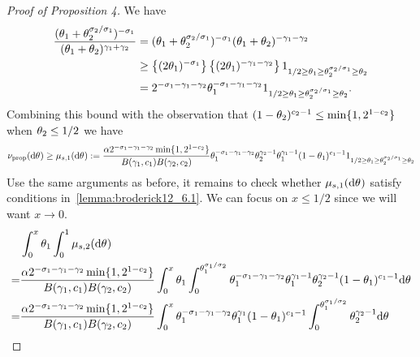 \begin{proof}[Proof of Proposition 4]
We have 
\begin{align*}
    \frac{(\variantfreqperpop{1}+\variantfreqperpop{2}^{\rate{2}/\rate{1}})^{-\rate{1}}}{(\variantfreqperpop{1}+\variantfreqperpop{2})^{\corr{1}+\corr{2}}}&=(\variantfreqperpop{1}+\variantfreqperpop{2}^{\rate{2}/\rate{1}})^{-\rate{1}}(\variantfreqperpop{1}+\variantfreqperpop{2})^{-\corr{1}-\corr{2}}\\
    &\ge \left\{ (2\variantfreqperpop{1} )^{-\rate{1}} \right\} \left\{(2\variantfreqperpop{1})^{-\corr{1} - \corr{2}} \right\}\bm{1}_{1/2 \ge \variantfreqperpop{1} \ge \variantfreqperpop{2}^{\rate{2}/\rate{1}}\ge \variantfreqperpop{2}  } \\
    &= 2^{-\rate{1}-\corr{1}-\corr{2}} \variantfreqperpop{1}^{-\rate{1}-\corr{1}-\corr{2}}\bm{1}_{1/2 \ge \variantfreqperpop{1} \ge \variantfreqperpop{2}^{\rate{2}/\rate{1}}\ge \variantfreqperpop{2}  }.
\end{align*}
Combining this bound with the observation that $(1-\theta_{2})^{c_{2}-1}\le \min\{1, 2^{1-c_{2}}\}$ when $\theta_{2}\le 1/2$ we have
\begin{align*}
    \ratemeasproposed(\de\vecvariantfreq{})\ge\mu_{s,1}(\de\vecvariantfreq{}):= \frac{\mass 2^{-\rate{1}-\corr{1}-\corr{2}}\min\{1, 2^{1-\conc{2}}\}}{B(\corr{1}, \conc{1})B(\corr{2}, \conc{2})}\variantfreqperpop{1}^{-\rate{1}-\corr{1}-\corr{2}} \variantfreqperpop{2}^{\corr{2}-1}\variantfreqperpop{1}^{\corr{1}-1}(1-\variantfreqperpop{1})^{\conc{1}-1} \bm{1}_{1/2 \ge \variantfreqperpop{1} \ge \variantfreqperpop{2}^{\rate{2}/\rate{1}}\ge \variantfreqperpop{2}}
\end{align*}
Use the same arguments as before, it remains to check whether $\mu_{s,1}(\de\vecvariantfreq{})$ satisfy conditions in~\cref{lemma:broderick12_6.1}. We can focus on $x\le 1/2$ since we will want $x\to 0$. 
\begin{align*}
    &\int_0^x \variantfreqperpop{1} \int_0^1 \mu_{s,2}(\de\vecvariantfreq{})\\
    =& \frac{\mass 2^{-\rate{1}-\corr{1}-\corr{2}}\min\{1, 2^{1-\conc{2}}\}}{B(\corr{1}, \conc{1})B(\corr{2}, \conc{2})}\int_0^x \variantfreqperpop{1} \int_0^{\variantfreqperpop{1}^{\rate{1}/\rate{2}}} \variantfreqperpop{1}^{-\rate{1}-\corr{1}-\corr{2}} \variantfreqperpop{1}^{\corr{1}-1}\variantfreqperpop{2}^{\corr{2}-1}(1-\variantfreqperpop{1})^{\conc{1}-1}\de\vecvariantfreq{}\\
    =& \frac{\mass 2^{-\rate{1}-\corr{1}-\corr{2}}\min\{1, 2^{1-\conc{2}}\}}{B(\corr{1}, \conc{1})B(\corr{2}, \conc{2})}\int_0^x \variantfreqperpop{1}^{-\rate{1}-\corr{1}-\corr{2}} \variantfreqperpop{1}^{\corr{1}} (1-\variantfreqperpop{1})^{\conc{1}-1} \int_0^{\variantfreqperpop{1}^{\rate{1}/\rate{2}}} \variantfreqperpop{2}^{\corr{2}-1}\de\vecvariantfreq{}\\

\end{align*}
\end{proof}
